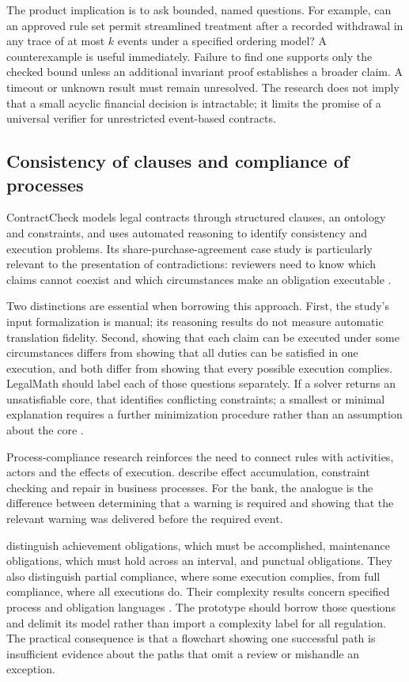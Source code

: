 The product implication is to ask bounded, named questions. For example, can an
approved rule set permit streamlined treatment after a recorded withdrawal in
any trace of at most $k$ events under a specified ordering model? A counterexample
is useful immediately. Failure to find one supports only the checked bound unless
an additional invariant proof establishes a broader claim. A timeout or unknown
result must remain unresolved. The research does not imply that a small acyclic
financial decision is intractable; it limits the promise of a universal verifier
for unrestricted event-based contracts.

\subsection{Consistency of clauses and compliance of processes}

ContractCheck models legal contracts through structured clauses, an ontology and
constraints, and uses automated reasoning to identify consistency and execution
problems. Its share-purchase-agreement case study is particularly relevant to
the presentation of contradictions: reviewers need to know which claims cannot
coexist and which circumstances make an obligation executable
\citep[secs.~3--7]{contractcheck2025}.

Two distinctions are essential when borrowing this approach. First, the study's
input formalization is manual; its reasoning results do not measure automatic
translation fidelity. Second, showing that each claim can be executed under
some circumstances differs from showing that all duties can be satisfied in one
execution, and both differ from showing that every possible execution complies.
LegalMath should label each of those questions separately. If a solver returns
an unsatisfiable core, that identifies conflicting constraints; a smallest or
minimal explanation requires a further minimization procedure rather than an
assumption about the core \citep[secs.~4--5, 8]{contractcheck2025}.

Process-compliance research reinforces the need to connect rules with activities,
actors and the effects of execution. \citet{ghose2007} describe effect accumulation,
constraint checking and repair in business processes. For the bank, the analogue
is the difference between determining that a warning is required and showing
that the relevant warning was delivered before the required event.

\citet[sec.~2]{compliancehard2015} distinguish achievement obligations, which must
be accomplished, maintenance obligations, which must hold across an interval,
and punctual obligations. They also distinguish partial compliance, where some
execution complies, from full compliance, where all executions do. Their
complexity results concern specified process and obligation languages
\citep[secs.~3--4]{compliancehard2015}. The prototype should borrow those questions
and delimit its model rather than import a complexity label for all regulation.
The practical consequence is that a flowchart showing one successful path is
insufficient evidence about the paths that omit a review or mishandle an exception.

